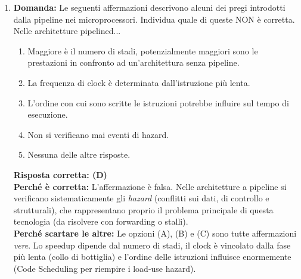 \documentclass[12pt, a4paper]{article}
\begin{document}
\begin{enumerate}
    \item \textbf{Domanda:} Le seguenti affermazioni descrivono alcuni dei pregi introdotti dalla pipeline nei microprocessori. Individua quale di queste NON è corretta. Nelle architetture pipelined...
    \begin{enumerate}[label=(\Alph*)]
        \item Maggiore è il numero di stadi, potenzialmente maggiori sono le prestazioni in confronto ad un'architettura senza pipeline.
        \item La frequenza di clock è determinata dall'istruzione più lenta.
        \item L'ordine con cui sono scritte le istruzioni potrebbe influire sul tempo di esecuzione.
        \item Non si verificano mai eventi di hazard.
        \item Nessuna delle altre risposte.
    \end{enumerate}
    \textbf{Risposta corretta: (D)} \\
    \textbf{Perché è corretta:} L'affermazione è falsa. Nelle architetture a pipeline si verificano sistematicamente gli \textit{hazard} (conflitti sui dati, di controllo e strutturali), che rappresentano proprio il problema principale di questa tecnologia (da risolvere con forwarding o stalli). \\
    \textbf{Perché scartare le altre:} Le opzioni (A), (B) e (C) sono tutte affermazioni \textit{vere}. Lo speedup dipende dal numero di stadi, il clock è vincolato dalla fase più lenta (collo di bottiglia) e l'ordine delle istruzioni influisce enormemente (Code Scheduling per riempire i load-use hazard).


\end{enumerate}
\end{document}
